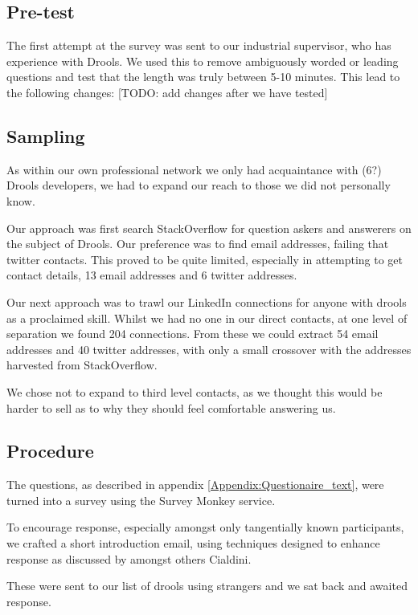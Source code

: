 \subsection{Pre-test}
The first attempt at the survey was sent to our industrial supervisor, who has experience with Drools.
We used this to remove ambiguously worded or leading questions and test that the length was truly between 5-10 minutes.
This lead to the following changes:
[TODO: add changes after we have tested]


\subsection{Sampling}
As within our own professional network we only had acquaintance with (6?) Drools developers, we had to expand our reach to those we did not personally know.

Our approach was first search StackOverflow for question askers and answerers on the subject of Drools.
Our preference was to find email addresses, failing that twitter contacts.
This proved to be quite limited, especially in attempting to get contact details, 13 email addresses and 6 twitter addresses.

Our next approach was to trawl our LinkedIn connections for anyone with drools as a proclaimed skill.
Whilst we had no one in our direct contacts, at one level of separation we found 204 connections.
From these we could extract 54 email addresses and 40 twitter addresses, with only a small crossover with the addresses harvested from StackOverflow.

We chose not to expand to third level contacts, as we thought this would be harder to sell as to why they should feel comfortable answering us.

\subsection{Procedure}

The questions, as described in appendix \ref{Appendix:Questionaire_text}, were turned into a survey using the Survey Monkey service.

To encourage response, especially amongst only tangentially known participants, we crafted a short introduction email, using techniques designed to enhance response as discussed by amongst others Cialdini\cite{goldstein2008yes}.

These were sent to our list of drools using strangers and we sat back and awaited response.
